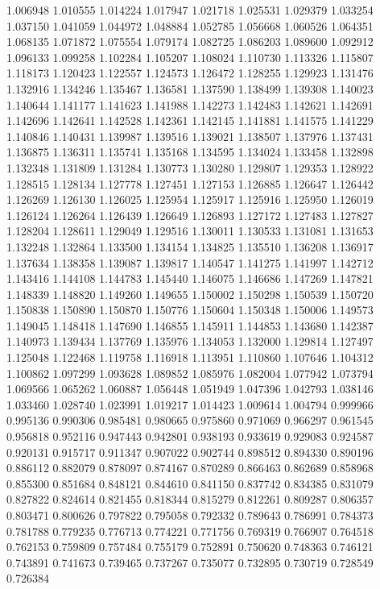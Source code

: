 1.006948
1.010555
1.014224
1.017947
1.021718
1.025531
1.029379
1.033254
1.037150
1.041059
1.044972
1.048884
1.052785
1.056668
1.060526
1.064351
1.068135
1.071872
1.075554
1.079174
1.082725
1.086203
1.089600
1.092912
1.096133
1.099258
1.102284
1.105207
1.108024
1.110730
1.113326
1.115807
1.118173
1.120423
1.122557
1.124573
1.126472
1.128255
1.129923
1.131476
1.132916
1.134246
1.135467
1.136581
1.137590
1.138499
1.139308
1.140023
1.140644
1.141177
1.141623
1.141988
1.142273
1.142483
1.142621
1.142691
1.142696
1.142641
1.142528
1.142361
1.142145
1.141881
1.141575
1.141229
1.140846
1.140431
1.139987
1.139516
1.139021
1.138507
1.137976
1.137431
1.136875
1.136311
1.135741
1.135168
1.134595
1.134024
1.133458
1.132898
1.132348
1.131809
1.131284
1.130773
1.130280
1.129807
1.129353
1.128922
1.128515
1.128134
1.127778
1.127451
1.127153
1.126885
1.126647
1.126442
1.126269
1.126130
1.126025
1.125954
1.125917
1.125916
1.125950
1.126019
1.126124
1.126264
1.126439
1.126649
1.126893
1.127172
1.127483
1.127827
1.128204
1.128611
1.129049
1.129516
1.130011
1.130533
1.131081
1.131653
1.132248
1.132864
1.133500
1.134154
1.134825
1.135510
1.136208
1.136917
1.137634
1.138358
1.139087
1.139817
1.140547
1.141275
1.141997
1.142712
1.143416
1.144108
1.144783
1.145440
1.146075
1.146686
1.147269
1.147821
1.148339
1.148820
1.149260
1.149655
1.150002
1.150298
1.150539
1.150720
1.150838
1.150890
1.150870
1.150776
1.150604
1.150348
1.150006
1.149573
1.149045
1.148418
1.147690
1.146855
1.145911
1.144853
1.143680
1.142387
1.140973
1.139434
1.137769
1.135976
1.134053
1.132000
1.129814
1.127497
1.125048
1.122468
1.119758
1.116918
1.113951
1.110860
1.107646
1.104312
1.100862
1.097299
1.093628
1.089852
1.085976
1.082004
1.077942
1.073794
1.069566
1.065262
1.060887
1.056448
1.051949
1.047396
1.042793
1.038146
1.033460
1.028740
1.023991
1.019217
1.014423
1.009614
1.004794
0.999966
0.995136
0.990306
0.985481
0.980665
0.975860
0.971069
0.966297
0.961545
0.956818
0.952116
0.947443
0.942801
0.938193
0.933619
0.929083
0.924587
0.920131
0.915717
0.911347
0.907022
0.902744
0.898512
0.894330
0.890196
0.886112
0.882079
0.878097
0.874167
0.870289
0.866463
0.862689
0.858968
0.855300
0.851684
0.848121
0.844610
0.841150
0.837742
0.834385
0.831079
0.827822
0.824614
0.821455
0.818344
0.815279
0.812261
0.809287
0.806357
0.803471
0.800626
0.797822
0.795058
0.792332
0.789643
0.786991
0.784373
0.781788
0.779235
0.776713
0.774221
0.771756
0.769319
0.766907
0.764518
0.762153
0.759809
0.757484
0.755179
0.752891
0.750620
0.748363
0.746121
0.743891
0.741673
0.739465
0.737267
0.735077
0.732895
0.730719
0.728549
0.726384
